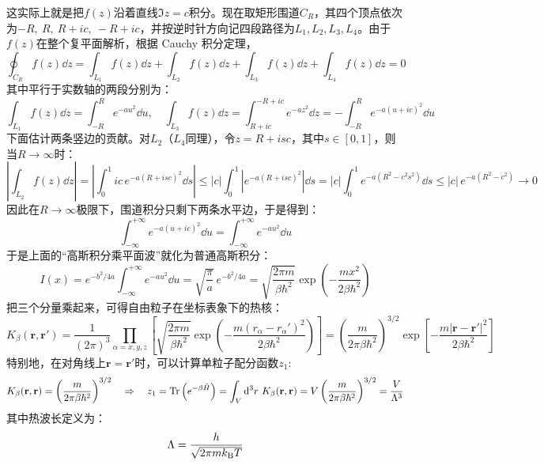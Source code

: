 这实际上就是把$f(z)$沿着直线$\Im z=c$积分。现在取矩形围道$C_R$，其四个顶点依次为$-R,\ R,\ R+ic,\ -R+ic$，并按逆时针方向记四段路径为$L_1,L_2,L_3,L_4$。由于$f(z)$在整个复平面解析，根据 Cauchy 积分定理，
\[\oint_{C_R}f(z)\dd{z}=\int_{L_1}f(z)\dd{z}+\int_{L_2}f(z)\dd{z}+\int_{L_3}f(z)\dd{z}+\int_{L_4}f(z)\dd{z}=0\]
其中平行于实数轴的两段分别为：
\[\int_{L_1}f(z)\dd{z}=\int_{-R}^{R}e^{-au^2}\dd{u}, \quad \int_{L_3}f(z)\dd{z}=\int_{R+ic}^{-R+ic}e^{-az^2}\dd{z}=-\int_{-R}^{R}e^{-a(u+ic)^2}\dd{u}\]
下面估计两条竖边的贡献。对$L_2$（$L_4$同理），令$z=R+isc$，其中$s\in[0,1]$，则当$R\to\infty$时：
\[\left|\int_{L_2}f(z)\dd{z}\right|=\left|\int_0^1 ic\,e^{-a(R+isc)^2}\dd{s}\right|\le |c|\int_0^1\left|e^{-a(R+isc)^2}\right|\dd{s}=|c|\int_0^1e^{-a(R^2-c^2s^2)}\dd{s}\le |c|\,e^{-a(R^2-c^2)} \to 0\]
因此在$R\to\infty$极限下，围道积分只剩下两条水平边，于是得到：
\[\boxed{\int_{-\infty}^{+\infty}e^{-a(u+ic)^2}\dd{u}=\int_{-\infty}^{+\infty}e^{-au^2}\dd{u}}\]
于是上面的“高斯积分乘平面波”就化为普通高斯积分：
\[I(x)=e^{-b^2/4a}\int_{-\infty}^{+\infty}e^{-au^2}\dd{u}=\sqrt{\frac{\pi}{a}}\,e^{-b^2/4a}=\sqrt{\frac{2\pi m}{\beta\hbar^2}}\exp\left(-\frac{mx^2}{2\beta\hbar^2}\right)\]
把三个分量乘起来，可得自由粒子在坐标表象下的热核：
\[K_{\beta}(\mathbf{r},\mathbf{r}')=\frac{1}{(2\pi)^3}\prod_{\alpha=x,y,z}\left[\sqrt{\frac{2\pi m}{\beta\hbar^2}}
\exp\left(-\frac{m(r_{\alpha}-r_{\alpha}')^2}{2\beta\hbar^2}\right)\right]=\left(\frac{m}{2\pi\beta\hbar^2}\right)^{3/2}\exp\left[-\frac{m|\mathbf{r}-\mathbf{r}'|^2}{2\beta\hbar^2}\right]\]
特别地，在对角线上$\mathbf{r}=\mathbf{r}'$时，可以计算单粒子配分函数$z_1$:
\[K_{\beta}(\mathbf{r},\mathbf{r})=\left(\frac{m}{2\pi\beta\hbar^2}\right)^{3/2} \quad \Rightarrow \quad z_1=\Tr\left(e^{-\beta\hat{H}}\right)=\int_V\dd[3]{r}\,K_{\beta}(\mathbf{r},\mathbf{r})=V\left(\frac{m}{2\pi\beta\hbar^2}\right)^{3/2}=\frac{V}{\Lambda^3}\]
其中热波长定义为：
\[\Lambda=\frac{h}{\sqrt{2\pi mk_{\rm B}T}}\]
